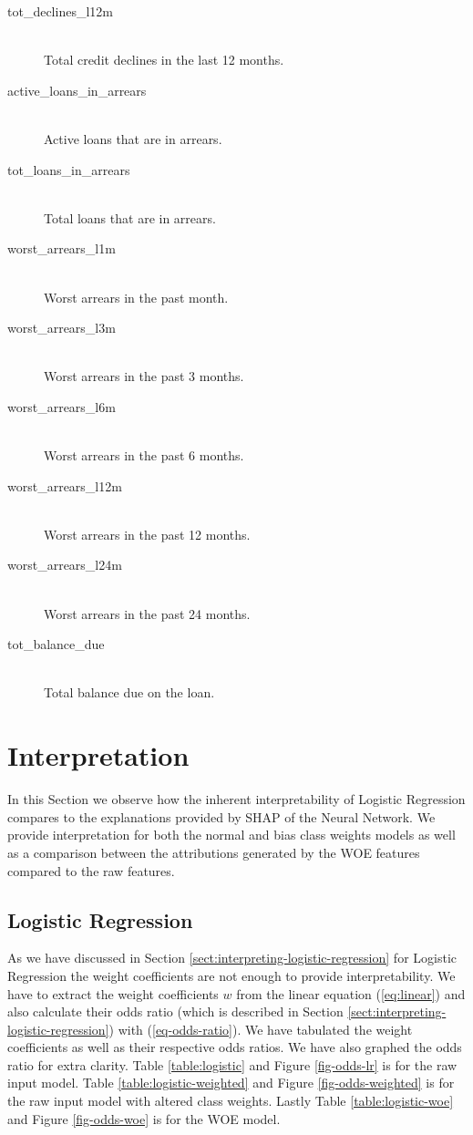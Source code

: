 \begin{description}
     \item[tot\_declines\_l12m] \hfill \\ Total credit declines in the last 12 months.
     \item[active\_loans\_in\_arrears] \hfill \\ Active loans that are in arrears.
     \item[tot\_loans\_in\_arrears] \hfill \\ Total loans that are in arrears.
     \item[worst\_arrears\_l1m] \hfill \\ Worst arrears in the past month.
     \item[worst\_arrears\_l3m] \hfill \\ Worst arrears in the past 3 months.
     \item[worst\_arrears\_l6m] \hfill \\ Worst arrears in the past 6 months.
     \item[worst\_arrears\_l12m] \hfill \\ Worst arrears in the past 12 months.
     \item[worst\_arrears\_l24m] \hfill \\ Worst arrears in the past 24 months.
     \item[tot\_balance\_due] \hfill \\ Total balance due on the loan.
 \end{description}
\section{Interpretation} \label{sec-interpretation}
In this Section we observe how the inherent interpretability of Logistic Regression compares to the explanations provided by SHAP of the Neural Network. We provide interpretation for both the normal and bias class weights models as well as a comparison between the attributions generated by the WOE features compared to the raw features.
\subsection{Logistic Regression}
As we have discussed in Section \ref{sect:interpreting-logistic-regression} for Logistic Regression the weight coefficients are not enough to provide interpretability.  We have to extract the weight coefficients $w$ from the linear equation (\ref{eq:linear}) and also calculate their odds ratio (which is described in Section \ref{sect:interpreting-logistic-regression}) with (\ref{eq-odds-ratio}). We have tabulated the weight coefficients as well as their respective odds ratios. We have also graphed the odds ratio for extra clarity. Table \ref{table:logistic} and Figure \ref{fig-odds-lr}  is for the raw input model. Table \ref{table:logistic-weighted} and Figure \ref{fig-odds-weighted} is for the raw input model with altered class weights. Lastly Table \ref{table:logistic-woe} and Figure \ref{fig-odds-woe} is for the WOE model.

